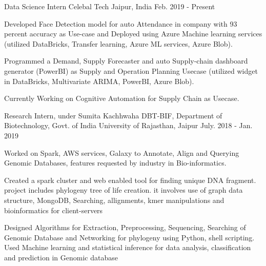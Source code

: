 
\vspace{-0.2cm}


\begin{cventries}

  
   \cventry
  {Data Science Intern}
  {Celebal Tech}
  {Jaipur, India}
  {Feb. 2019 - Present}
  {
    \begin{cvitems}
    \item Developed Face Detection model for auto Attendance in company with 93 percent accuracy as Use-case and Deployed using Azure Machine learning services (utilized DataBricks, Transfer learning, Azure ML services, Azure Blob).
    \item Programmed a Demand, Supply Forecaster and auto Supply-chain dashboard generator (PowerBI) as Supply and Operation Planning Usecase (utilized widget in DataBricks, Multivariate ARIMA, PowerBI, Azure Blob).
    \item Currently Working on Cognitive Automation for Supply Chain as Usecase.
    \end{cvitems}
  }

  \cventry
  {Research Intern, under Sumita Kachhwaha}
  {DBT-BIF, Department of Biotechnology, Govt. of India}
  {University of Rajasthan, Jaipur}
  {July. 2018 - Jan. 2019}
  {
    \begin{cvitems}
    \item {Worked on Spark, AWS services, Galaxy to Annotate, Align and Querying Genomic Databases, features requested by industry in Bio-informatics.}
    \item {Created a spark cluster and web enabled tool for finding unique DNA fragment. project includes  phylogeny tree of life creation. it involves use of graph data structure, MongoDB, Searching, allignments, kmer manipulations and bioinformatics for client-servers }
    \item {Designed Algorithms for Extraction, Preprocessing, Sequencing, Searching of Genomic Database and Networking for phylogeny using Python, shell scripting. Used Machine learning and statistical inference for data analysis, classification and prediction in Genomic database}
    \end{cvitems}
  }



\end{cventries}
